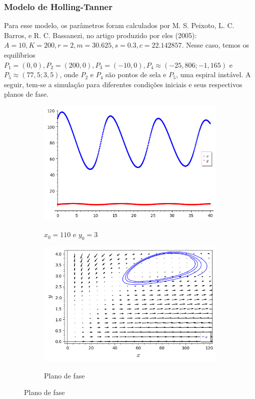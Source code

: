 \subsubsection{Modelo de Holling-Tanner}

Para esse modelo, os parâmetros foram calculados por M. S. Peixoto, L. C. Barros, e R. C. Bassanezi, no artigo produzido por eles \cite{mp_lb_rb_2005} (2005): $A = 10, K = 200, r = 2, m = 30.625, s = 0.3, c = 22.142857$. Nesse caso, temos os equilíbrios $P_1 = \left(0,0 \right), P_2 = \left( 200, 0 \right), P_3 = \left( -10, 0 \right), P_4 \approx \left( -25,806; -1,165 \right)$ e $P_5 \approx \left( 77,5; 3,5 \right)$, onde $P_2$ e $P_4$ são pontos de sela e $P_5$, uma espiral instável. A seguir, tem-se a simulação para diferentes condições iniciais e seus respectivos planos de fase.

\begin{figure}[H]
    \centering
    \begin{subfigure}{0.4\textwidth}
        \includegraphics[scale=0.48]{figuras/HT_1.png}
        \label{fig:HT_1}
        \caption{$x_0 = 110$ e $y_0 = 3$}
    \end{subfigure}
    \begin{subfigure}{0.4\textwidth}
        \includegraphics[scale=0.48]{figuras/HT_2.png}
        \label{fig:HT_2}
        \caption{Plano de fase}
    \end{subfigure}
\end{figure}


